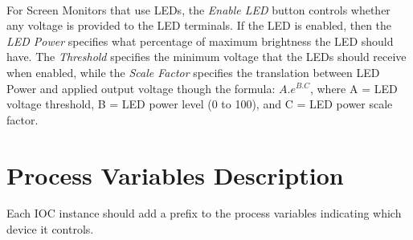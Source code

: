 \documentclass[openany]{article}
\begin{document}
    \paragraph{} For Screen Monitors that use LEDs, the \emph{Enable LED} button controls whether any voltage is provided to the LED terminals. If the LED is enabled, then the \emph{LED Power} specifies what percentage of maximum brightness the LED should have. The \emph{Threshold} specifies the minimum voltage that the LEDs should receive when enabled, while the \emph{Scale Factor} specifies the translation between LED Power and applied output voltage though the formula: $A.e^{B.C}$, where A = LED voltage threshold, B = LED power level (0 to 100), and C = LED power scale factor.

\newpage
\section{Process Variables Description}\label{sec:process-variables}

    Each IOC instance should add a prefix to the process variables indicating which device it controls.
\end{document}
